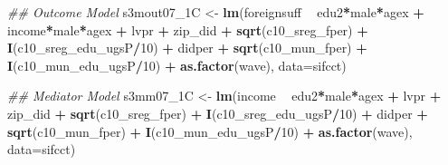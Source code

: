 \documentclass[
]{article}
\newenvironment{Shaded}{\begin{snugshade}}{\end{snugshade}}
\newcommand{\CommentTok}[1]{\textcolor[rgb]{0.56,0.35,0.01}{\textit{#1}}}
\newcommand{\DataTypeTok}[1]{\textcolor[rgb]{0.13,0.29,0.53}{#1}}
\newcommand{\DecValTok}[1]{\textcolor[rgb]{0.00,0.00,0.81}{#1}}
\newcommand{\KeywordTok}[1]{\textcolor[rgb]{0.13,0.29,0.53}{\textbf{#1}}}
\newcommand{\NormalTok}[1]{#1}
\newcommand{\OperatorTok}[1]{\textcolor[rgb]{0.81,0.36,0.00}{\textbf{#1}}}
\newcommand{\StringTok}[1]{\textcolor[rgb]{0.31,0.60,0.02}{#1}}
\begin{document}
\begin{Shaded}
\begin{Highlighting}[]
\CommentTok{## Outcome Model }
\NormalTok{s3mout07_1C <-}\StringTok{ }\KeywordTok{lm}\NormalTok{(foreignsuff  }\OperatorTok{~}\StringTok{ }\NormalTok{edu2}\OperatorTok{*}\NormalTok{male}\OperatorTok{*}\NormalTok{agex }\OperatorTok{+}\StringTok{ }\NormalTok{income}\OperatorTok{*}\NormalTok{male}\OperatorTok{*}\NormalTok{agex }\OperatorTok{+}\StringTok{ }\NormalTok{lvpr }\OperatorTok{+}\StringTok{  }
\StringTok{                    }\NormalTok{zip_did }\OperatorTok{+}\StringTok{ }\KeywordTok{sqrt}\NormalTok{(c10_sreg_fper) }\OperatorTok{+}\StringTok{ }\KeywordTok{I}\NormalTok{(c10_sreg_edu_ugsP}\OperatorTok{/}\DecValTok{10}\NormalTok{) }\OperatorTok{+}\StringTok{ }
\StringTok{                    }\NormalTok{didper }\OperatorTok{+}\StringTok{ }\KeywordTok{sqrt}\NormalTok{(c10_mun_fper) }\OperatorTok{+}\StringTok{ }\KeywordTok{I}\NormalTok{(c10_mun_edu_ugsP}\OperatorTok{/}\DecValTok{10}\NormalTok{) }\OperatorTok{+}\StringTok{ }
\StringTok{                    }\KeywordTok{as.factor}\NormalTok{(wave), }\DataTypeTok{data=}\NormalTok{sifcct)}

\CommentTok{## Mediator Model}
\NormalTok{s3mm07_1C <-}\StringTok{ }\KeywordTok{lm}\NormalTok{(income  }\OperatorTok{~}\StringTok{ }\NormalTok{edu2}\OperatorTok{*}\NormalTok{male}\OperatorTok{*}\NormalTok{agex }\OperatorTok{+}\StringTok{ }\NormalTok{lvpr }\OperatorTok{+}\StringTok{  }
\StringTok{                  }\NormalTok{zip_did }\OperatorTok{+}\StringTok{ }\KeywordTok{sqrt}\NormalTok{(c10_sreg_fper) }\OperatorTok{+}\StringTok{ }\KeywordTok{I}\NormalTok{(c10_sreg_edu_ugsP}\OperatorTok{/}\DecValTok{10}\NormalTok{) }\OperatorTok{+}\StringTok{ }
\StringTok{                  }\NormalTok{didper }\OperatorTok{+}\StringTok{ }\KeywordTok{sqrt}\NormalTok{(c10_mun_fper) }\OperatorTok{+}\StringTok{ }\KeywordTok{I}\NormalTok{(c10_mun_edu_ugsP}\OperatorTok{/}\DecValTok{10}\NormalTok{) }\OperatorTok{+}\StringTok{ }
\StringTok{                  }\KeywordTok{as.factor}\NormalTok{(wave), }\DataTypeTok{data=}\NormalTok{sifcct)}


\end{Highlighting}
\end{Shaded}
\end{document}

